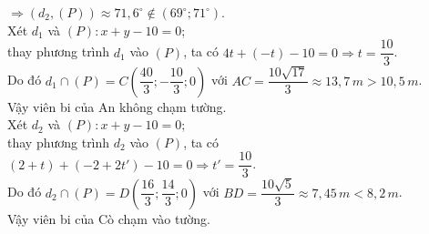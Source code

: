 \begin{ex}
{\begin{itemchoice}
 $\Rightarrow \left(d_2,(P)\right)\approx 71,6^{\circ }\notin \left(69^{\circ };71^{\circ }\right)$.\\
 \itemch Xét $d_1$ và $(P)\colon x+y-10=0$;\\
 thay phương trình $d_1$ vào $(P)$, ta có $4t+(-t)-10=0\Rightarrow t=\dfrac{10}{3}$.\\
 Do đó $d_1\cap (P)=C\left(\dfrac{40}{3};-\dfrac{10}{3};0\right)$ với $AC=\dfrac{10\sqrt{17}}{3}\approx 13{,}7\,m>10{,}5\,m$.\\
 Vậy viên bi của An không chạm tường.\\
 Xét $d_2$ và $(P)\colon x+y-10=0$;\\
 thay phương trình $d_2$ vào $(P)$, ta có $(2+t)+\left(-2+2t'\right)-10=0\Rightarrow t'=\dfrac{10}{3}$.\\
 Do đó $d_2\cap (P)=D\left(\dfrac{16}{3};\dfrac{14}{3};0\right)$ với $BD=\dfrac{10\sqrt{5}}{3}\approx 7{,}45\,m<8{,}2\,m$.\\
 Vậy viên bi của Cò chạm vào tường.
 \end{itemchoice}
 }
\end{ex}
